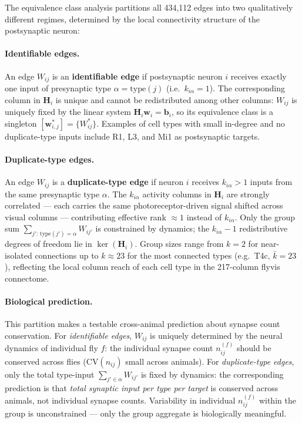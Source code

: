\documentclass[11pt,a4paper]{article}
\begin{document}
The equivalence class analysis partitions all 434,112 edges into two
qualitatively different regimes, determined by the local connectivity structure
of the postsynaptic neuron:

\paragraph{Identifiable edges.}
An edge $W_{ij}$ is an \textbf{identifiable edge} if postsynaptic neuron $i$
receives exactly one input of presynaptic type $\alpha = \mathrm{type}(j)$
(i.e.\ $k_{i\alpha} = 1$).  The corresponding column in $\mathbf{H}_i$ is
unique and cannot be redistributed among other columns: $W_{ij}$ is uniquely
fixed by the linear system $\mathbf{H}_i\mathbf{w}_i = \mathbf{b}_i$, so its
equivalence class is a singleton $[\mathbf{w}_{i,j}^*] = \{W_{ij}^*\}$.
Examples of cell types with small in-degree and no duplicate-type inputs include
R1, L3, and Mi1 as postsynaptic targets.

\paragraph{Duplicate-type edges.}
An edge $W_{ij}$ is a \textbf{duplicate-type edge} if neuron $i$ receives
$k_{i\alpha} > 1$ inputs from the same presynaptic type $\alpha$.  The
$k_{i\alpha}$ activity columns in $\mathbf{H}_i$ are strongly correlated ---
each carries the same photoreceptor-driven signal shifted across visual columns
--- contributing effective rank $\approx 1$ instead of $k_{i\alpha}$.  Only
the group sum $\sum_{j':\,\mathrm{type}(j')=\alpha} W_{ij'}$ is constrained by
dynamics; the $k_{i\alpha}-1$ redistributive degrees of freedom lie in
$\ker(\mathbf{H}_i)$.  Group sizes range from $k=2$ for near-isolated connections up to $k \approx 23$
for the most connected types (e.g.\ T4c, $\bar{k}=23$), reflecting the local
column reach of each cell type in the 217-column flyvis connectome.

\paragraph{Biological prediction.}
This partition makes a testable cross-animal prediction about synapse count
conservation.  For \emph{identifiable edges}, $W_{ij}$ is uniquely determined
by the neural dynamics of individual fly $f$: the individual synapse count
$n_{ij}^{(f)}$ should be conserved across flies ($\mathrm{CV}(n_{ij})$ small
across animals).  For \emph{duplicate-type edges}, only the total type-input
$\sum_{j' \in \alpha} W_{ij'}$ is fixed by dynamics: the corresponding
prediction is that \emph{total synaptic input per type per target} is conserved
across animals, not individual synapse counts.  Variability in individual
$n_{ij}^{(f)}$ within the group is unconstrained --- only the group aggregate
is biologically meaningful.
\end{document}
